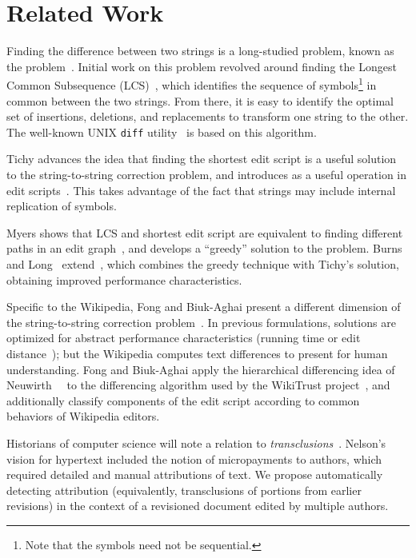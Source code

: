 \section{Related Work}
\label{sec:diff-related}

Finding the difference between two strings is a long-studied problem,
known as the  problem~\cite{Wagner1974}.
Initial work on this problem revolved around finding the
Longest Common Subsequence (LCS)~\cite{Gusfield1999}, which identifies the
sequence of symbols\footnote{Note that the symbols need not be sequential.}
in common between the two strings.
From there, it is easy to identify the optimal
set of insertions, deletions, and replacements to transform
one string to the other.
The well-known UNIX \texttt{diff} utility~\cite{Hunt1976} is based
on this algorithm.

Tichy advances the idea that finding the shortest edit script is a
useful solution to the string-to-string correction problem, and
introduces  as a useful operation in edit
scripts~\cite{Tichy1984}.
This takes advantage of the fact that strings may include internal
replication of symbols.

Myers shows that LCS and shortest edit script are equivalent to finding
different paths in an edit graph~\cite{Myers1986}, and develops a
``greedy'' solution to the problem.
Burns and Long~\cite{Burns1997} extend~\cite{Reichenberger1991},
which combines the greedy technique with Tichy's solution,
obtaining improved performance characteristics.

Specific to the Wikipedia, Fong and Biuk-Aghai present a different
dimension of the string-to-string correction problem~\cite{Fong2010}.
In previous formulations, solutions are optimized for abstract
performance characteristics (\eg running time or
edit distance~\cite{Levenshtein1966}); but the Wikipedia computes text differences
to present for human understanding.
Fong and Biuk-Aghai apply the hierarchical differencing idea of
Neuwirth~\etal~\cite{Neuwirth1992} to the differencing algorithm used by the
WikiTrust project~\cite{Adler2007}, and additionally classify components
of the edit script according to common behaviors of Wikipedia editors.

Historians of computer science will note a relation
to \textit{transclusions}~\cite{Nelson81}.
Nelson's vision for hypertext included the notion
of micropayments to authors, which required detailed
and manual attributions of text.
We propose automatically detecting attribution
(equivalently, transclusions of portions from earlier revisions)
in the context of a revisioned document edited
by multiple authors.



